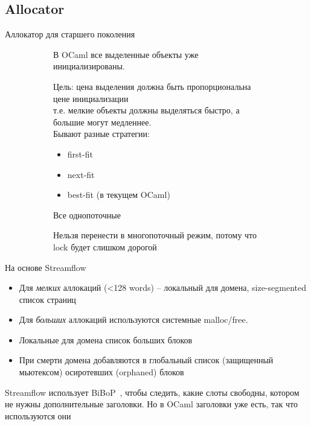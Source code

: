 \documentclass[aspectratio=169
  , xcolor={svgnames} 
  , hyperref={ colorlinks,citecolor=DeepPink4
             , linkcolor=DarkRed,urlcolor=DarkBlue}
  , russian
  ]{beamer}
\theoremstyle{exerciseStyle1}
\renewcommand{\cite}[1]{}
\begin{document}
\subsection{Allocator}

\begin{frame}{Аллокатор для старшего поколения}
\begin{figure}[ht]
\begin{subfigure}{.95\textwidth}
В OCaml все выделенные объекты уже инициализированы.\vspace{.5cm}

Цель: цена выделения должна быть пропорциональна цене инициализации\\
т.е. мелкие объекты должны выделяться быстро, а большие могут медленнее.\\

Бывают разные стратегии:
\begin{itemize}
\item first-fit
\item next-fit
\item best-fit (в текущем OCaml)
\end{itemize}
Все однопоточные\vspace{.5cm}

Нельзя перенести в многопоточный режим, потому что lock будет слишком дорогой
\end{subfigure}
\begin{subfigure}{.49\textwidth}

\end{subfigure}
\end{figure}
\end{frame}



\begin{frame}{На основе Streamflow\cite{streamflow}}
\begin{itemize}
  \item Для \textit{мелких }аллокаций (<128 words) -- локальный для домена, size-segmented список страниц 
  \item Для \textit{больших} аллокаций используются системные malloc/free.
  \item Локальные для домена список больших блоков
  \item При смерти домена добавляются в глобальный список (защищенный мьютексом) осиротевших (orphaned) блоков
\end{itemize}
\vspace{.5cm}

Streamflow использует BiBoP~\cite{bibop}, чтобы следить, какие слоты свободны, котором не нужны дополнительные заголовки. Но в OCaml заголовки уже есть, так что используются они
\end{frame}
\end{document}
